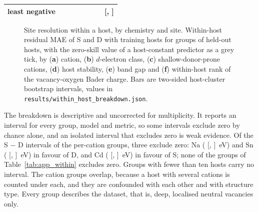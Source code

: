 \begin{table}[H]
\begin{tabularx}{\linewidth}{Xrrrrrrc}
least negative & \numWithinHostBreakdownGroupsBaderRankHighestNHostsByMetricWithinHostMae{} & \numWithinHostBreakdownGroupsBaderRankHighestNSitesWithin{} & \numWithinHostBreakdownGroupsBaderRankHighestVTwoSZeroSkillMaePoint{} & \numWithinHostBreakdownGroupsBaderRankHighestVTwoSWithinHostMaePoint{} & \numWithinHostBreakdownGroupsBaderRankHighestVTwoDWithinHostMaePoint{} & \numWithinHostBreakdownGroupsBaderRankHighestDifferencesSMinusDVTwoWithinHostMaePoint{} & [\numWithinHostBreakdownGroupsBaderRankHighestDifferencesSMinusDVTwoWithinHostMaeCiNinetyFiveItemOne{}, \numWithinHostBreakdownGroupsBaderRankHighestDifferencesSMinusDVTwoWithinHostMaeCiNinetyFiveItemTwo{}] \\
\bottomrule
\end{tabularx}
\end{table}

\begin{figure}[H]
\centering
{}
\caption{Site resolution within a host, by chemistry and site. Within-host residual MAE of S and D with \numWithinHostBreakdownBudget{} training hosts for groups of held-out hosts, with the zero-skill value of a host-constant predictor as a grey tick, by (\textbf{a}) cation, (\textbf{b}) $d$-electron class, (\textbf{c}) shallow-donor-prone cations, (\textbf{d}) host stability, (\textbf{e}) band gap and (\textbf{f}) within-host rank of the vacancy-oxygen Bader charge. Bars are two-sided host-cluster bootstrap intervals, values in \texttt{results/within\_host\_breakdown.json}.\label{fig:app_within}}
\end{figure}

The breakdown is descriptive and uncorrected for multiplicity. It reports an interval for every group, model and metric, so some intervals exclude zero by chance alone, and an isolated interval that excludes zero is weak evidence. Of the S $-$ D intervals of the per-cation groups, three exclude zero: Na (\numWithinHostBreakdownGroupsCationNaDifferencesSMinusDVTwoWithinHostMaePoint{} [\numWithinHostBreakdownGroupsCationNaDifferencesSMinusDVTwoWithinHostMaeCiNinetyFiveItemOne{}, \numWithinHostBreakdownGroupsCationNaDifferencesSMinusDVTwoWithinHostMaeCiNinetyFiveItemTwo{}]~eV) and Sn (\numWithinHostBreakdownGroupsCationSnDifferencesSMinusDVTwoWithinHostMaePoint{} [\numWithinHostBreakdownGroupsCationSnDifferencesSMinusDVTwoWithinHostMaeCiNinetyFiveItemOne{}, \numWithinHostBreakdownGroupsCationSnDifferencesSMinusDVTwoWithinHostMaeCiNinetyFiveItemTwo{}]~eV) in favour of D, and Cd (\numWithinHostBreakdownGroupsCationCdDifferencesSMinusDVTwoWithinHostMaePoint{} [\numWithinHostBreakdownGroupsCationCdDifferencesSMinusDVTwoWithinHostMaeCiNinetyFiveItemOne{}, \numWithinHostBreakdownGroupsCationCdDifferencesSMinusDVTwoWithinHostMaeCiNinetyFiveItemTwo{}]~eV) in favour of S; none of the groups of Table~\ref{tab:app_within} excludes zero. Groups with fewer than ten hosts carry no interval. The cation groups overlap, because a host with several cations is counted under each, and they are confounded with each other and with structure type. Every group describes the dataset, that is, deep, localised neutral vacancies only.
